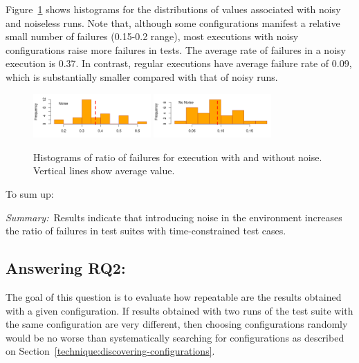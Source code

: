 \documentclass[conference]{IEEEtran}
\begin{document}
Figure~\ref{fig:historgram-random} shows histograms for the distributions of values associated with noisy and noiseless runs. Note that, although some configurations manifest a relative small number of failures (0.15-0.2 range), most executions with noisy configurations raise more failures in tests. The average rate of failures in a noisy execution is 0.37. In contrast, regular executions have average failure rate of 0.09, which is substantially smaller compared with that of noisy runs.
\begin{figure}[t!]
    \centering
    \includegraphics[width=0.4\textwidth]{figs/hist-failures-noise.png}
    \includegraphics[width=0.4\textwidth]{figs/hist-failures-nonoise.png}
    \vspace{-3ex}
    \caption{Histograms of ratio of failures for execution with and without noise. Vertical lines show average value.}
    \label{fig:historgram-random}
\end{figure}
To sum up: 
\begin{center}
\begin{tcolorbox}[enhanced,width=3.4in,center upper,drop shadow southwest,sharp corners]
\emph{Summary:}~Results indicate that introducing noise in the environment increases the ratio of failures in test suites with time-constrained test cases.
\end{tcolorbox}
\end{center}

\subsection{Answering RQ2: \rqtwo}
\label{sec:answer-rqtwo}

The goal of this question is to evaluate how repeatable are the results obtained with a given configuration. If results obtained with two runs of the test suite with the same configuration are very different, then choosing configurations randomly would be no worse than systematically searching for configurations as described on Section~\ref{technique:discovering-configurations}. 
\end{document}
